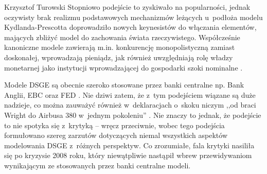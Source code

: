 \begin{artplenv}{Krzysztof Turowski}
Stopniowo podejście to zyskiwało na popularności, jednak oczywisty brak realizmu podstawowych mechanizmów
leżących u~podłoża modelu Kydlanda-Prescotta doprowadziło nowych keynesistów do włączania elementów, mających zbliżyć model do
zachowania świata rzeczywistego. Współcześnie kanoniczne modele zawierają m.in. konkurencję monopolistyczną zamiast
doskonałej, wprowadzają pieniądz, jak również uwzględniają rolę władzy monetarnej jako instytucji wprowadzającej do
gospodarki szoki nominalne
\parencite{fernandez-villaverde_econometrics_2010}.

Modele DSGE są obecnie szeroko stosowane przez banki centralne np. Bank Anglii, EBC oraz FED
\parencite{smets_dsge_2010,tovar_dsge_2009}.
Nie dziwi zatem, że z~tym podejściem wiązane są duże
nadzieje, co można zauważyć również w~deklaracjach o~skoku niczym ,,od braci Wright do Airbusa 380 w~jednym pokoleniu''
\parencite{fernandez-villaverde_econometrics_2010}.
Nie znaczy to jednak, że podejście to nie spotyka się z~krytyką
 --  wręcz przeciwnie, wobec tego podejścia formułowano szereg zarzutów dotyczących niemal wszystkich aspektów
modelowania DSGE z~różnych perspektyw. Co zrozumiałe, fala krytyki nasiliła się po kryzysie 2008 roku, który
niewątpliwie nastąpił wbrew przewidywaniom wynikającym ze stosowanych przez banki centralne modeli.


\end{artplenv}
